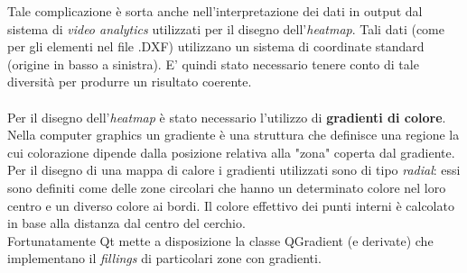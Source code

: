 Tale complicazione è sorta anche nell'interpretazione dei dati in output dal sistema di \textit{video analytics} utilizzati per il disegno dell'\textit{heatmap}. Tali dati (come per gli elementi nel file .DXF) utilizzano un sistema di coordinate standard (origine in basso a sinistra). E' quindi stato necessario tenere conto di tale diversità per produrre un risultato coerente.  \\ \\
Per il disegno dell'\textit{heatmap} è stato necessario l'utilizzo di \textbf{gradienti di colore}. Nella computer graphics un gradiente è una struttura che definisce una regione la cui colorazione dipende dalla posizione relativa alla "zona" coperta dal gradiente. 
Per il disegno di una mappa di calore i gradienti utilizzati sono di tipo \textit{radial}: essi sono definiti come delle zone circolari che hanno un determinato colore nel loro centro e un diverso colore ai bordi. Il colore effettivo dei punti interni è calcolato in base alla distanza dal centro del cerchio. \\
Fortunatamente Qt mette a disposizione la classe QGradient (e  derivate) che implementano il \textit{fillings} di particolari zone con gradienti.

